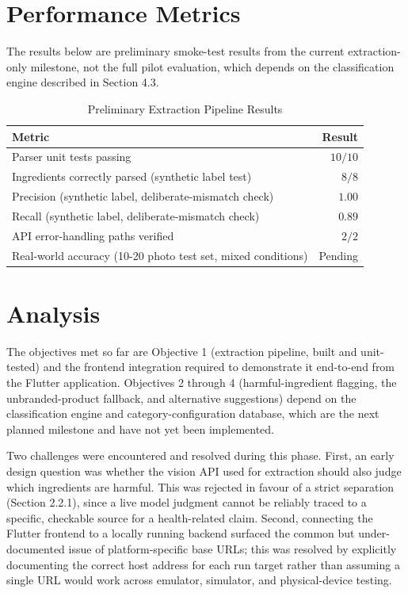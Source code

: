 \documentclass{report}
\begin{document}
\section{Performance Metrics}

The results below are preliminary smoke-test results from the current
extraction-only milestone, not the full pilot evaluation, which depends
on the classification engine described in Section 4.3.

\begin{table}[h]
\centering
\begin{tabular}{|l|r|}
  \hline
  \textbf{Metric} & \textbf{Result} \\
  \hline
  Parser unit tests passing & $10/10$ \\
  \hline
  Ingredients correctly parsed (synthetic label test) & $8/8$ \\
  \hline
  Precision (synthetic label, deliberate-mismatch check) & $1.00$ \\
  \hline
  Recall (synthetic label, deliberate-mismatch check) & $0.89$ \\
  \hline
  API error-handling paths verified & $2/2$ \\
  \hline
  Real-world accuracy (10-20 photo test set, mixed conditions) & Pending \\
  \hline
\end{tabular}
\caption{Preliminary Extraction Pipeline Results}
\label{tab:performance}
\end{table}

\section{Analysis}

The objectives met so far are Objective 1 (extraction pipeline, built
and unit-tested) and the frontend integration required to demonstrate it
end-to-end from the Flutter application. Objectives 2 through 4
(harmful-ingredient flagging, the unbranded-product fallback, and
alternative suggestions) depend on the classification engine and
category-configuration database, which are the next planned milestone
and have not yet been implemented.

Two challenges were encountered and resolved during this phase. First,
an early design question was whether the vision API used for extraction
should also judge which ingredients are harmful. This was rejected in
favour of a strict separation (Section 2.2.1), since a live model
judgment cannot be reliably traced to a specific, checkable source for a
health-related claim. Second, connecting the Flutter frontend to a
locally running backend surfaced the common but under-documented issue
of platform-specific base URLs; this was resolved by explicitly
documenting the correct host address for each run target rather than
assuming a single URL would work across emulator, simulator, and
physical-device testing.
\end{document}
